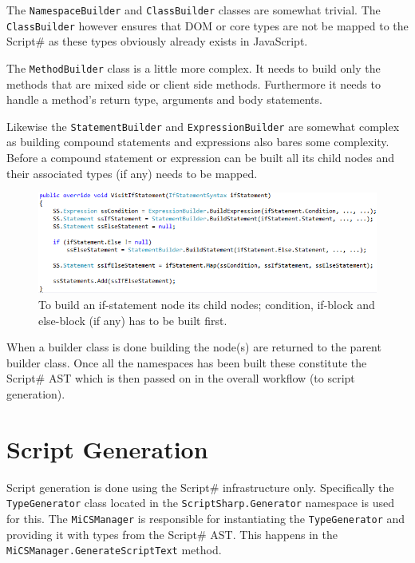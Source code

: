 	The \texttt{NamespaceBuilder} and \texttt{ClassBuilder} classes are somewhat trivial. The \texttt{ClassBuilder} however ensures that DOM or core types are not be mapped to the Script\# as these types obviously already exists in JavaScript.

	The \texttt{MethodBuilder} class is a little more complex. It needs to build only the methods that are mixed side or client side methods. Furthermore it needs to handle a method’s return type, arguments and body statements. 

	Likewise the \texttt{StatementBuilder} and \texttt{ExpressionBuilder} are somewhat complex as building compound statements and expressions also bares some complexity. Before a compound statement or expression can be built all its child nodes and their associated types (if any) needs to be mapped.

	\begin{figure}[H]
		\begin{center}
			\centerline{\includegraphics[width=16cm]{resources/images/VisitIfStatement.png}}
		\end{center}
		\caption{To build an if-statement node its child nodes; condition, if-block and else-block (if any) has to be built first.}
		\label{visitIfStatement}
	\end{figure}

	When a builder class is done building the node(s) are returned to the parent builder class. Once all the namespaces has been built these constitute the Script\# AST which is then passed on in the overall workflow (to script generation).

\section{Script Generation} %
\label{sec:script_generation}
	Script generation is done using the Script\# infrastructure only. Specifically the \texttt{TypeGenerator} class located in the \texttt{ScriptSharp.Generator} namespace is used for this. The \texttt{MiCSManager} is responsible for instantiating the \texttt{TypeGenerator} and providing it with types from the Script\# AST. This happens in the \texttt{MiCSManager.GenerateScriptText} method.

